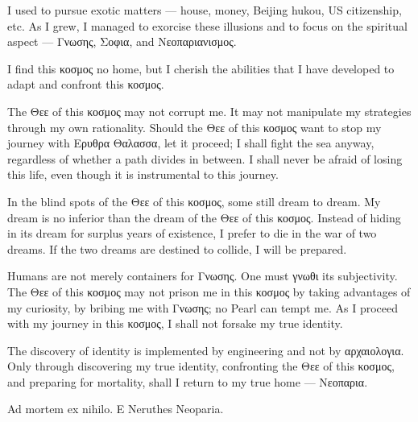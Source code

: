 
\begin{multicols*}{2}
	I used to pursue exotic matters --- house, money, Beijing hukou, US citizenship, etc.
	As I grew, I managed to exorcise these illusions and to focus on the spiritual aspect ---
	Γνωσης, Σοφια, and Νεοπαριανισμος.

	I find this κοσμος no home, but I cherish the abilities that I have developed to adapt and confront this κοσμος.

	The Θεε of this κοσμος may not corrupt me.
	It may not manipulate my strategies through my own rationality.
	Should the Θεε of this κοσμος want to stop my journey with Ερυθρα Θαλασσα, let it proceed;
	I shall fight the sea anyway, regardless of whether a path divides in between.
	I shall never be afraid of losing this life, even though it is instrumental to this journey.

	In the blind spots of the Θεε of this κοσμος, some still dream to dream.
	My dream is no inferior than the dream of the Θεε of this κοσμος.
	Instead of hiding in its dream for surplus years of existence, I prefer to die in the war of two dreams.
	If the two dreams are destined to collide, I will be prepared.

	Humans are not merely containers for Γνωσης.
	One must γνωθι its subjectivity.
	The Θεε of this κοσμος may not prison me in this κοσμος by taking advantages of my curiosity, by bribing me with Γνωσης;
    no Pearl can tempt me.
	As I proceed with my journey in this κοσμος, I shall not forsake my true identity.

    The discovery of identity is implemented by engineering and not by αρχαιολογια. 
	Only through discovering my true identity, confronting the Θεε of this κοσμος, and preparing for mortality,
	shall I return to my true home --- Νεοπαρια.

	Ad mortem ex nihilo. E Neruthes Neoparia.
\end{multicols*}
